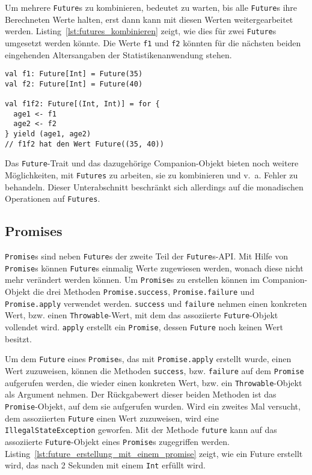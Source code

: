 Um mehrere \lstinline|Future|s zu kombinieren, bedeutet zu warten, bis alle \lstinline|Future|s ihre Berechneten Werte halten, erst dann kann mit diesen Werten weitergearbeitet werden.
Listing~\ref{lst:futures_kombinieren} zeigt, wie dies für zwei \lstinline|Future|s umgesetzt werden könnte.
Die Werte \lstinline|f1| und \lstinline|f2| könnten für die nächsten beiden eingehenden Altersangaben der Statistikenanwendung stehen.

\begin{lstlisting}[caption=Futures kombinieren, label=lst:futures_kombinieren]
val f1: Future[Int] = Future(35)
val f2: Future[Int] = Future(40)

val f1f2: Future[(Int, Int)] = for {
  age1 <- f1
  age2 <- f2
} yield (age1, age2)
// f1f2 hat den Wert Future((35, 40))
\end{lstlisting}

Das \lstinline|Future|-Trait und das dazugehörige Companion-Objekt bieten noch weitere Möglichkeiten, mit \lstinline|Futures| zu arbeiten, sie zu kombinieren und v.~a. Fehler zu behandeln.
Dieser Unterabschnitt beschränkt sich allerdings auf die monadischen Operationen auf \lstinline|Futures|.



\subsection{Promises} %
\label{sub:promises}

\lstinline|Promise|s sind neben \lstinline|Future|s der zweite Teil der \lstinline|Future|s-API.
Mit Hilfe von \lstinline|Promise|s können \lstinline|Future|s einmalig Werte zugewiesen werden, wonach diese nicht mehr verändert werden können.
Um \lstinline|Promise|s zu erstellen können im Companion-Objekt die drei Methoden \lstinline|Promise.success|, \lstinline|Promise.failure| und \lstinline|Promise.apply| verwendet werden.
\lstinline|success| und \lstinline|failure| nehmen einen konkreten Wert, bzw. einen \lstinline|Throwable|-Wert, mit dem das assoziierte \lstinline|Future|-Objekt vollendet wird.
\lstinline|apply| erstellt ein \lstinline|Promise|, dessen \lstinline|Future| noch keinen Wert besitzt.

Um dem \lstinline|Future| eines \lstinline|Promise|s, das mit \lstinline|Promise.apply| erstellt wurde, einen Wert zuzuweisen, können die Methoden \lstinline|success|, bzw. \lstinline|failure| auf dem \lstinline|Promise| aufgerufen werden, die wieder einen konkreten Wert, bzw. ein \lstinline|Throwable|-Objekt als Argument nehmen.
Der Rückgabewert dieser beiden Methoden ist das \lstinline|Promise|-Objekt, auf dem sie aufgerufen wurden.
Wird ein zweites Mal versucht, dem assoziierten \lstinline|Future| einen Wert zuzuweisen, wird eine \lstinline|IllegalStateException| geworfen.
Mit der Methode \lstinline|future| kann auf das assoziierte \lstinline|Future|-Objekt eines \lstinline|Promise|s zugegriffen werden.
Listing~\ref{lst:future_erstellung_mit_einem_promise} zeigt, wie ein Future erstellt wird, das nach 2 Sekunden mit einem \lstinline|Int| erfüllt wird.

